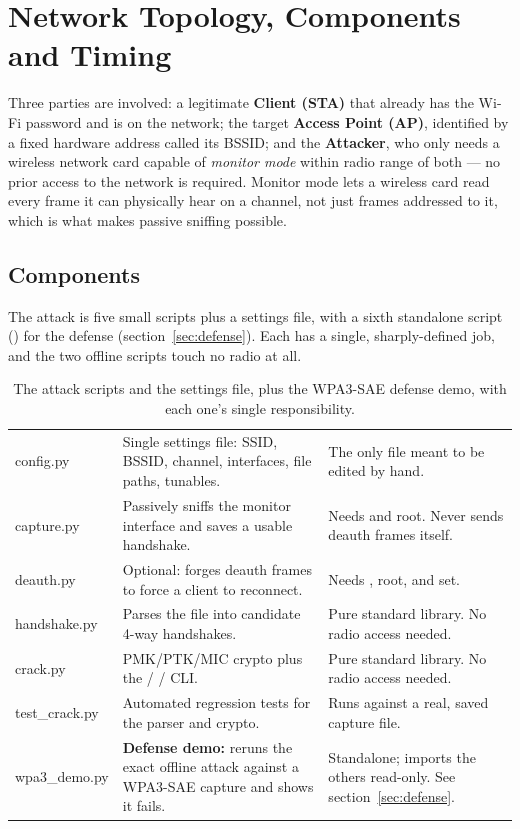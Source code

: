 \section{Network Topology, Components and Timing}

Three parties are involved: a legitimate \textbf{Client (STA)} that already has the Wi-Fi password and is on the network; the target \textbf{Access Point (AP)}, identified by a fixed hardware address called its BSSID; and the \textbf{Attacker}, who only needs a wireless network card capable of \emph{monitor mode} within radio range of both --- no prior access to the network is required. Monitor mode lets a wireless card read every frame it can physically hear on a channel, not just frames addressed to it, which is what makes passive sniffing possible.

\bigskip
\FIGONE

\subsection{Components}
The attack is five small scripts plus a settings file, with a sixth standalone script () for the defense (section~\ref{sec:defense}). Each has a single, sharply-defined job, and the two offline scripts touch no radio at all.

\begin{table}[H]\centering\small
\setlength{\tabcolsep}{9pt}
\begin{tabularx}{\textwidth}{@{}>{\ttfamily}l L{5.3cm} L{5.3cm}@{}}
\toprule
{} &  &  \\
\midrule
config.py & Single settings file: SSID, BSSID, channel, interfaces, file paths, tunables. & The only file meant to be edited by hand. \\
capture.py & Passively sniffs the monitor interface and saves a usable handshake. & Needs  and root. Never sends deauth frames itself. \\
deauth.py & Optional: forges deauth frames to force a client to reconnect. & Needs , root, and  set. \\
handshake.py & Parses the  file into candidate 4-way handshakes. & Pure standard library. No radio access needed. \\
crack.py & PMK/PTK/MIC crypto plus the  /  /  CLI. & Pure standard library. No radio access needed. \\
test\_crack.py & Automated regression tests for the parser and crypto. & Runs against a real, saved capture file. \\
wpa3\_demo.py & \textbf{Defense demo:} reruns the exact offline attack against a WPA3-SAE capture and shows it fails. & Standalone; imports the others read-only. See section~\ref{sec:defense}. \\
\bottomrule
\end{tabularx}
\caption{The attack scripts and the settings file, plus the WPA3-SAE defense demo, with each one's single responsibility.}
\end{table}

